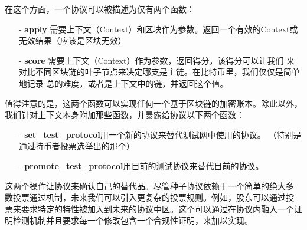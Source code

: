 \documentclass[letterpaper]{article}
\begin{document}
在这个方面，一个协议可以被描述为仅有两个函数：
\begin{itemize}
\item[-] \textbf{apply} 需要上下文（Context）和区块作为参数。返回一个有效的Context或无效结果（应该是区块无效）
\item[-] \textbf{score} 需要上下文（Context）作为参数，返回得分，该得分可以让我们
  来对比不同区块链的叶子节点来决定哪支是主链。在比特币里，我们仅仅是简单地记录
  总的难度，或者是上下文中的链，并返回这个值。
\end{itemize}

值得注意的是，这两个函数可以实现任何一个基于区块链的加密账本。除此以外，
我们针对上下文本身附加那些函数，并暴露给协议以下两个函数：

\begin{itemize}
\item[-] \textbf{set\_test\_protocol}用一个新的协议来替代测试网中使用的协议。
  （特别是通过持币者投票选举出的那个）
\item[-] \textbf{promote\_test\_protocol}用目前的测试协议来替代目前的协议。
\end{itemize}

这两个操作让协议来确认自己的替代品。尽管种子协议依赖于一个简单的绝大多
数投票通过机制，未来我们可以引入更复杂的投票规则。例如，股东可以通过投
票来要求特定的特性被加入到未来的协议中区。这个可以通过在协议内融入一个证明检测机制并且要求每一个修改包含一个合规性证明，来加以实现。
\end{document}
